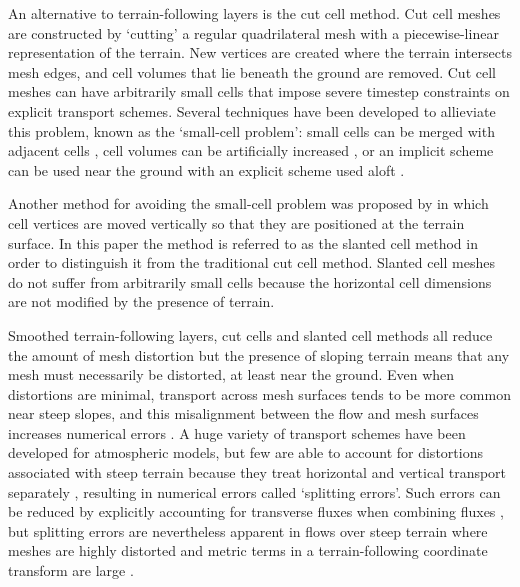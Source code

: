 An alternative to terrain-following layers is the cut cell method.  Cut cell meshes are constructed by `cutting' a regular quadrilateral mesh with a piecewise-linear representation of the terrain.  New vertices are created where the terrain intersects mesh edges, and cell volumes that lie beneath the ground are removed.  Cut cell meshes can have arbitrarily small cells that impose severe timestep constraints on explicit transport schemes.  Several techniques have been developed to allieviate this problem, known as the `small-cell problem': small cells can be merged with adjacent cells \citep{yamazaki2016}, cell volumes can be artificially increased \citep{steppeler2002}, or an implicit scheme can be used near the ground with an explicit scheme used aloft \citep{jebens2011}.

Another method for avoiding the small-cell problem was proposed by \citep{shaw-weller2016} in which cell vertices are moved vertically so that they are positioned at the terrain surface.  In this paper the method is referred to as the slanted cell method in order to distinguish it from the traditional cut cell method.  Slanted cell meshes do not suffer from arbitrarily small cells because the horizontal cell dimensions are not modified by the presence of terrain.  

Smoothed terrain-following layers, cut cells and slanted cell methods all reduce the amount of mesh distortion but the presence of sloping terrain means that any mesh must necessarily be distorted, at least near the ground.
Even when distortions are minimal, transport across mesh surfaces tends to be more common near steep slopes, and this misalignment between the flow and mesh surfaces increases numerical errors \citep{leonard1993,schaer2002,shaw-weller2016}.
A huge variety of transport schemes have been developed for atmospheric models, but few are able to account for distortions associated with steep terrain because they treat horizontal and vertical transport separately , resulting in numerical errors called `splitting errors'.
Such errors can be reduced by explicitly accounting for transverse fluxes when combining fluxes \citep{leonard1996}, but splitting errors are nevertheless apparent in flows over steep terrain where meshes are highly distorted and metric terms in a terrain-following coordinate transform are large \citep{weller2017}.

